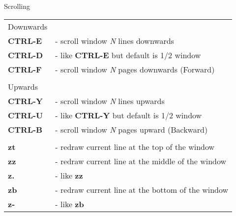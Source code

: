 \documentclass[a4paper,8pt]{extarticle}
\begin{document}
\begin{multicols*}{3}
        \columnbreak

        \noindent
        {\Huge Scrolling}\\
        \begin{tabular}{ l l }
            Downwards                           &                                                           \\
            \textbf{CTRL-E}                     &    - scroll window \textsl{N} lines downwards             \\
            \textbf{CTRL-D}                     &    - like \textbf{CTRL-E} but default is 1/2 window       \\
            \textbf{CTRL-F}                     &    - scroll window \textsl{N} pages downwards (Forward)   \\
                                                &                                                           \\
            Upwards                             &                                                           \\
            \textbf{CTRL-Y}                     &    - scroll window \textsl{N} lines upwards               \\
            \textbf{CTRL-U}                     &    - like \textbf{CTRL-Y} but default is 1/2 window       \\
            \textbf{CTRL-B}                     &    - scroll window \textsl{N} pages upward (Backward)     \\
                                                &                                                           \\
            \textbf{zt}                         &    - redraw current line at the top of the window         \\
            \textbf{zz}                         &    - redraw current line at the middle of the window      \\
            \textbf{z.}                         &    - like \textbf{zz}                                     \\
            \textbf{zb}                         &    - redraw current line at the bottom of the window      \\
            \textbf{z-}                         &    - like \textbf{zb}                                     \\
        \end{tabular}


\end{multicols*}
\end{document}
